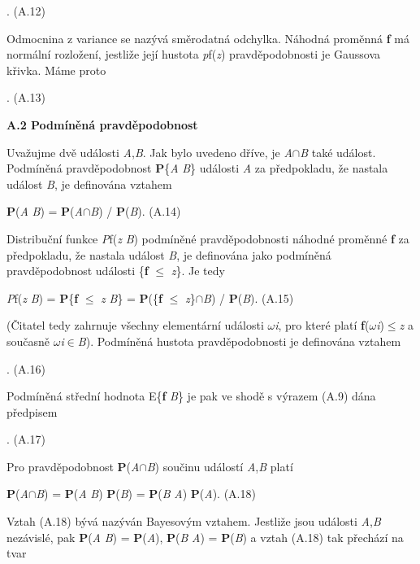  . (A.12)

\noindent Odmocnina z variance se nazývá směrodatná odchylka. Náhodná proměnná \textbf{f} má normální rozložení, jestliže její hustota \textit{p}f(\textit{z}) pravděpodobnosti je Gaussova křivka. Máme proto

 . (A.13)

\noindent \textbf{A.2  Podmíněná pravděpodobnost}

\noindent Uvažujme dvě události \textit{A},\textit{B}. Jak bylo uvedeno dříve, je \textit{A}$\cap$\textit{B} také událost. Podmíněná pravděpodobnost \textbf{P}\{\textit{A} \textbar  \textit{B}\} události \textit{A} za předpokladu, že nastala událost \textit{B}, je definována vztahem

\textbf{ P}(\textit{A} \textbar  \textit{B}) = \textbf{P}(\textit{A}$\cap$\textit{B}) / \textbf{P}(\textit{B}). (A.14)

\noindent Distribuční funkce \textit{P}f(\textit{z} \textbar  \textit{B}) podmíněné pravděpodobnosti náhodné proměnné \textbf{f} za předpokladu, že nastala událost \textit{B}, je definována jako podmíněná pravděpodobnost události \{\textbf{f} $\leq$ \textit{z}\}. Je tedy

 \textit{P}f(\textit{z} \textbar  \textit{B}) = \textbf{P}\{\textbf{f} $\leq$ \textit{z} \textbar  \textit{B}\} = \textbf{P}(\{\textbf{f} $\leq$ \textit{z}\}$\cap$\textit{B}) / \textbf{P}(\textit{B}). (A.15)

\noindent (Čitatel tedy zahrnuje všechny elementární události $\omega$\textit{i}, pro které platí  \textbf{f}($\omega$\textit{i})$\leq$\textit{z} a současně $\omega$\textit{i}$\in$\textit{B}). Podmíněná hustota pravděpodobnosti je definována vztahem

 . (A.16)

\noindent Podmíněná střední hodnota E\{\textbf{f} \textbar  \textit{B}\} je pak ve shodě s výrazem (A.9) dána předpisem

 . (A.17)

\noindent Pro pravděpodobnost \textbf{P}(\textit{A}$\cap$\textit{B}) součinu událostí \textit{A},\textit{B} platí

\textbf{ P}(\textit{A}$\cap$\textit{B}) = \textbf{P}(\textit{A} \textbar  \textit{B}) \textbf{P}(\textit{B}) = \textbf{P}(\textit{B} \textbar  \textit{A}) \textbf{P}(\textit{A}). (A.18)

\noindent Vztah (A.18) bývá nazýván Bayesovým vztahem. Jestliže jsou události \textit{A},\textit{B} nezávislé, pak \textbf{P}(\textit{A} \textbar  \textit{B}) = \textbf{P}(\textit{A}),  \textbf{P}(\textit{B} \textbar  \textit{A}) = \textbf{P}(\textit{B})  a vztah (A.18) tak přechází na tvar

